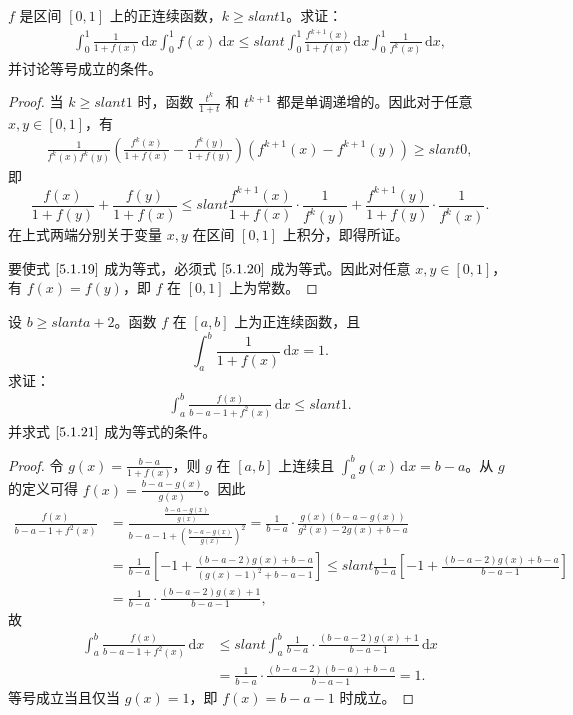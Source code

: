 \documentclass[../../main.tex]{subfiles}
\begin{document}
\begin{example}
\( f \) 是区间 \([0,1]\) 上的正连续函数，\( k \geqslant slant 1 \)。求证：
\begin{align}
\int_{0}^{1} \frac{1}{1 + f(x)} \, \mathrm{d}x \int_{0}^{1} f(x) \, \mathrm{d}x \leqslant slant \int_{0}^{1} \frac{f^{k + 1}(x)}{1 + f(x)} \, \mathrm{d}x \int_{0}^{1} \frac{1}{f^k(x)} \, \mathrm{d}x, \label{5.1.19}
\end{align}
并讨论等号成立的条件。
\end{example}
\begin{proof}
当 \( k \geqslant slant 1 \) 时，函数 \( \frac{t^k}{1 + t} \) 和 \( t^{k + 1} \) 都是单调递增的。因此对于任意 \( x, y \in [0,1] \)，有
\begin{align}
\frac{1}{f^k(x)f^k(y)} \left( \frac{f^k(x)}{1 + f(x)} - \frac{f^k(y)}{1 + f(y)} \right) \left( f^{k + 1}(x) - f^{k + 1}(y) \right) \geqslant slant 0, \label{5.1.20}
\end{align}
即
\[
\frac{f(x)}{1 + f(y)} + \frac{f(y)}{1 + f(x)} \leqslant slant \frac{f^{k + 1}(x)}{1 + f(x)} \cdot \frac{1}{f^k(y)} + \frac{f^{k + 1}(y)}{1 + f(y)} \cdot \frac{1}{f^k(x)}.
\]
在上式两端分别关于变量 \( x, y \) 在区间 \([0,1]\) 上积分，即得所证。

要使式 \(\eqref{5.1.19}\) 成为等式，必须式 \(\eqref{5.1.20}\) 成为等式。因此对任意 \( x, y \in [0,1] \)，有 \( f(x) = f(y) \)，即 \( f \) 在 \([0,1]\) 上为常数。
\end{proof}

\begin{example}
设 \( b \geqslant slant a + 2 \)。函数 \( f \) 在 \([a,b]\) 上为正连续函数，且
\[
\int_{a}^{b} \frac{1}{1 + f(x)} \, \mathrm{d}x = 1.
\]
求证：
\begin{align}
\int_{a}^{b} \frac{f(x)}{b - a - 1 + f^2(x)} \, \mathrm{d}x \leqslant slant 1. \label{5.1.21}
\end{align}
并求式 \(\eqref{5.1.21}\) 成为等式的条件。
\end{example}
\begin{proof}
令 \( g(x) = \frac{b - a}{1 + f(x)} \)，则 \( g \) 在 \([a,b]\) 上连续且 \( \int_{a}^{b} g(x) \, \mathrm{d}x = b - a \)。从 \( g \) 的定义可得 \( f(x) = \frac{b - a - g(x)}{g(x)} \)。因此
\begin{align*}
\frac{f(x)}{b-a-1+f^2(x)}&=\frac{\frac{b-a-g(x)}{g(x)}}{b-a-1+\left( \frac{b-a-g(x)}{g(x)} \right) ^2}=\frac{1}{b-a}\cdot \frac{g(x)(b-a-g(x))}{g^2(x)-2g(x)+b-a}
\\
&=\frac{1}{b-a}\left[ -1+\frac{(b-a-2)g(x)+b-a}{(g(x)-1)^2+b-a-1} \right] \leqslant slant \frac{1}{b-a}\left[ -1+\frac{(b-a-2)g(x)+b-a}{b-a-1} \right] 
\\
&=\frac{1}{b-a}\cdot \frac{(b-a-2)g(x)+1}{b-a-1},
\end{align*}
故
\begin{align*}
\int_a^b{\frac{f(x)}{b-a-1+f^2(x)}\,\mathrm{d}x}&\leqslant slant \int_a^b{\frac{1}{b-a}}\cdot \frac{(b-a-2)g(x)+1}{b-a-1}\,\mathrm{d}x
\\
&=\frac{1}{b-a}\cdot \frac{(b-a-2)(b-a)+b-a}{b-a-1}=1.
\end{align*}
等号成立当且仅当 \( g(x) = 1 \)，即 \( f(x) = b - a - 1 \) 时成立。
\end{proof}
\end{document}
